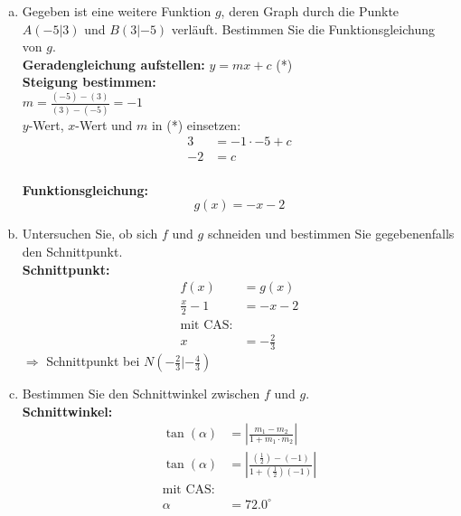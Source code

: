 \documentclass[12pt,fleqn]{article}
\theoremstyle{aufg}
\theoremstyle{bsp}
\begin{document}
\begin{flushleft}
\begin{enumerate}[a)]
\item 
Gegeben ist eine weitere Funktion $g$, deren Graph durch die Punkte $A(-5|3)$ und $B(3|-5)$ verl\"auft. Bestimmen Sie die Funktionsgleichung von $g$. \\ 
{\bf Geradengleichung aufstellen:} \quad $y=mx+c$ (*) \\ 
{\bf Steigung bestimmen:} \\ 
$m=\frac{(-5)-(3)}{(3)-(-5)}=-1$ \\ 
$y$-Wert, $x$-Wert und $m$ in (*) einsetzen: 
\begin{align*} 
3&=-1\cdot-5+ c \\ 
-2&= c 
\end{align*} \\ 
{\bf Funktionsgleichung:} 
\[g(x)=- x - 2\]
\item 
Untersuchen Sie, ob sich $f$ und $g$ schneiden und bestimmen Sie gegebenenfalls den Schnittpunkt. \\ 
{\bf Schnittpunkt:} 
\begin{align*} 
f(x)&=g(x) \\ 
\frac{x}{2} - 1&=- x - 2 \\ 
\text{mit CAS:} \\ 
x&=- \frac{2}{3}\end{align*} 
$\Rightarrow$ Schnittpunkt bei $N(- \frac{2}{3}|- \frac{4}{3})$ \\ 

\item 
Bestimmen Sie den Schnittwinkel zwischen $f$ und $g$. \\ 
{\bf Schnittwinkel:} \\ 
\begin{align*} 
\tan(\alpha) &=\left|\frac{m_1-m_2}{1+m_1\cdot m_2}\right| \\ 
\tan(\alpha) &=\left|\frac{(\frac{1}{2})-(-1)}{1+(\frac{1}{2})(-1)}\right| \\ 
\text{mit CAS:} \\ 
\alpha &=72.0^{\circ} 
\end{align*} 

\end{enumerate} 
\end{flushleft} 
\end{document}
